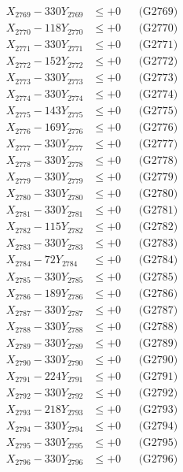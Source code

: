 \documentclass[a4paper,10pt]{article}
\begin{document}
{\begin{align}
X_{2769} - 330Y_{2769} &\leq +0 && \text{(G2769)} \\
X_{2770} - 118Y_{2770} &\leq +0 && \text{(G2770)} \\
\allowbreak
X_{2771} - 330Y_{2771} &\leq +0 && \text{(G2771)} \\
X_{2772} - 152Y_{2772} &\leq +0 && \text{(G2772)} \\
X_{2773} - 330Y_{2773} &\leq +0 && \text{(G2773)} \\
X_{2774} - 330Y_{2774} &\leq +0 && \text{(G2774)} \\
X_{2775} - 143Y_{2775} &\leq +0 && \text{(G2775)} \\
X_{2776} - 169Y_{2776} &\leq +0 && \text{(G2776)} \\
X_{2777} - 330Y_{2777} &\leq +0 && \text{(G2777)} \\
X_{2778} - 330Y_{2778} &\leq +0 && \text{(G2778)} \\
X_{2779} - 330Y_{2779} &\leq +0 && \text{(G2779)} \\
X_{2780} - 330Y_{2780} &\leq +0 && \text{(G2780)} \\
\allowbreak
X_{2781} - 330Y_{2781} &\leq +0 && \text{(G2781)} \\
X_{2782} - 115Y_{2782} &\leq +0 && \text{(G2782)} \\
X_{2783} - 330Y_{2783} &\leq +0 && \text{(G2783)} \\
X_{2784} - 72Y_{2784} &\leq +0 && \text{(G2784)} \\
X_{2785} - 330Y_{2785} &\leq +0 && \text{(G2785)} \\
X_{2786} - 189Y_{2786} &\leq +0 && \text{(G2786)} \\
X_{2787} - 330Y_{2787} &\leq +0 && \text{(G2787)} \\
X_{2788} - 330Y_{2788} &\leq +0 && \text{(G2788)} \\
X_{2789} - 330Y_{2789} &\leq +0 && \text{(G2789)} \\
X_{2790} - 330Y_{2790} &\leq +0 && \text{(G2790)} \\
\allowbreak
X_{2791} - 224Y_{2791} &\leq +0 && \text{(G2791)} \\
X_{2792} - 330Y_{2792} &\leq +0 && \text{(G2792)} \\
X_{2793} - 218Y_{2793} &\leq +0 && \text{(G2793)} \\
X_{2794} - 330Y_{2794} &\leq +0 && \text{(G2794)} \\
X_{2795} - 330Y_{2795} &\leq +0 && \text{(G2795)} \\
X_{2796} - 330Y_{2796} &\leq +0 && \text{(G2796)} \\

\end{align}}
\end{document}
